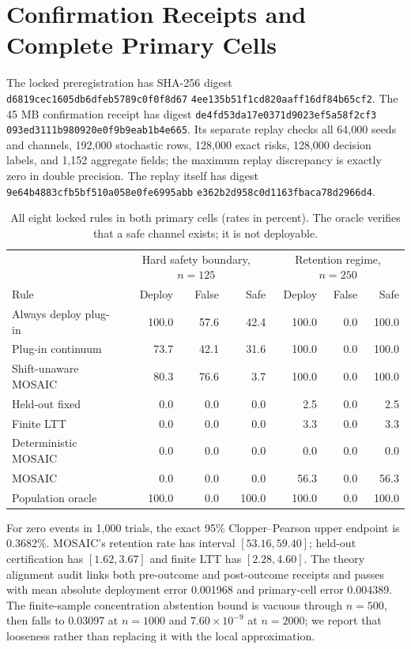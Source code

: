 \section{Confirmation Receipts and Complete Primary Cells}

\begingroup\raggedright
The locked preregistration has SHA-256 digest
\texttt{d6819cec1605db6dfeb5789c0f0f8d67}\allowbreak
\texttt{4ee135b51f1cd820aaff16df84b65cf2}.
The 45 MB confirmation receipt has digest
\texttt{de4fd53da17e0371d9023ef5a58f2cf3}\allowbreak
\texttt{093ed3111b980920e0f9b9eab1b4e665}.
Its separate replay checks all 64,000 seeds and channels, 192,000 stochastic
rows, 128,000 exact risks, 128,000 decision labels, and 1,152 aggregate fields;
the maximum replay discrepancy is exactly zero in double precision.  The
replay itself has digest
\texttt{9e64b4883cfb5bf510a058e0fe6995abb}\allowbreak
\texttt{e362b2d958c0d1163fbaca78d2966d4}.\par
\endgroup

\begin{table}[t]
\centering
\small
\setlength{\tabcolsep}{5.0pt}
\begin{tabular}{lrrrrrr}
\hline
& \multicolumn{3}{c}{Hard safety boundary, $n=125$}
& \multicolumn{3}{c}{Retention regime, $n=250$} \\
Rule & Deploy & False & Safe & Deploy & False & Safe \\
\hline
Always deploy plug-in & 100.0 & 57.6 & 42.4 & 100.0 & 0.0 & 100.0 \\
Plug-in continuum     &  73.7 & 42.1 & 31.6 & 100.0 & 0.0 & 100.0 \\
Shift-unaware MOSAIC  &  80.3 & 76.6 &  3.7 & 100.0 & 0.0 & 100.0 \\
Held-out fixed        &   0.0 &  0.0 &  0.0 &   2.5 & 0.0 &   2.5 \\
Finite LTT            &   0.0 &  0.0 &  0.0 &   3.3 & 0.0 &   3.3 \\
Deterministic MOSAIC  &   0.0 &  0.0 &  0.0 &   0.0 & 0.0 &   0.0 \\
MOSAIC                &   0.0 &  0.0 &  0.0 &  56.3 & 0.0 &  56.3 \\
Population oracle     & 100.0 &  0.0 &100.0 & 100.0 & 0.0 & 100.0 \\
\hline
\end{tabular}
\caption{All eight locked rules in both primary cells (rates in percent).
The oracle verifies that a safe channel exists; it is not deployable.}
\label{supp:tab:allprimary}
\end{table}

For zero events in 1,000 trials, the exact 95\% Clopper--Pearson upper endpoint
is 0.3682\%.  MOSAIC's retention rate has interval $[53.16,59.40]$; held-out
certification has $[1.62,3.67]$ and finite LTT has $[2.28,4.60]$.  The theory
alignment audit links both pre-outcome and post-outcome receipts and passes
with mean absolute deployment error 0.001968 and primary-cell error 0.004389.
The finite-sample concentration abstention bound is vacuous through $n=500$,
then falls to 0.03097 at $n=1000$ and $7.60\times10^{-9}$ at $n=2000$; we
report that looseness rather than replacing it with the local approximation.
